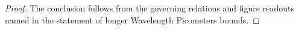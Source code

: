 \begin{proof}
  The conclusion follows from the governing relations and figure readouts named in the statement of longer Wavelength Picometers bounds.
\end{proof}
